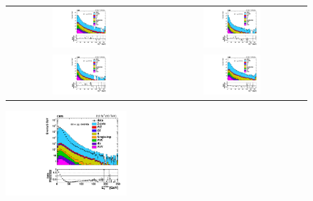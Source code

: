 \begin{figure}[!ht]
\begin{center}
\begin{tabular}{cc}
\includegraphics[width=0.4\textwidth]{MET/figs/h_met_nupfcands_0013_pt_ll_signalregion_inclusive_passtrig.pdf} &
\includegraphics[width=0.4\textwidth]{MET/figs/h_met_nupfcands_1316_pt_ll_signalregion_inclusive_passtrig.pdf} \\
\includegraphics[width=0.4\textwidth]{MET/figs/h_met_nupfcands_1624_pt_ll_signalregion_inclusive_passtrig.pdf} &
\includegraphics[width=0.4\textwidth]{MET/figs/h_met_nupfcands_2430_pt_ll_signalregion_inclusive_passtrig.pdf} \\
\end{tabular}
\includegraphics[width=0.4\textwidth]{MET/figs/h_met_nupfcands_30in_pt_ll_signalregion_inclusive_passtrig.pdf} 

\end{center}
\end{figure}
